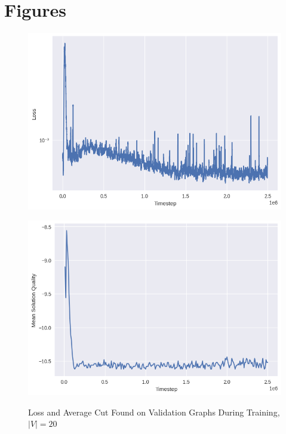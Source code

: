 \documentclass{article}
\begin{document}


\clearpage
\section{Figures}

\begin{figure}[ht]
    \caption{Loss and Average Cut Found on Validation Graphs During Training, $|V|=20$}
    \centering
    \includegraphics[scale=0.5]{../ER_20spin/eco/min_cut/network/loss.png}

    \includegraphics[scale=0.5]{../ER_20spin/eco/min_cut/network/training_curve.png}
    \label{fig:min-cut-training}
\end{figure}
\end{document}
